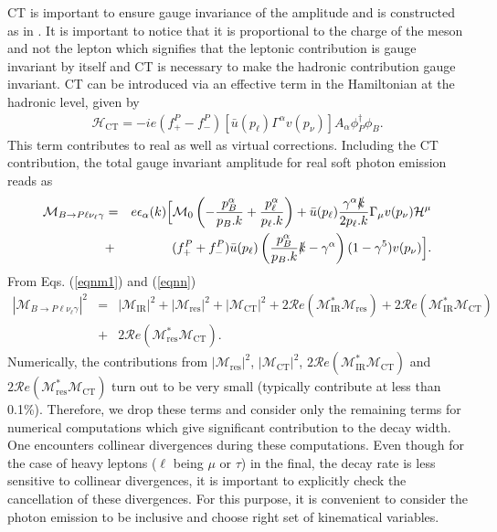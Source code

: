 \documentclass[a4paper,11pt]{article}
\begin{document}
	CT is important to ensure gauge invariance of the amplitude and is constructed as in \cite{Mishra:2020orb}. It is important to notice that it is proportional to the charge of the meson and not the lepton which signifies that the leptonic contribution is gauge invariant by itself and CT is necessary to make the hadronic contribution gauge invariant. CT can be introduced via an effective term in the Hamiltonian at the hadronic level, given by	
		\begin{eqnarray}
	\mathcal{H}_{\text{CT}}=-i e(f_+^P-f_-^P) \left[\bar{u}(p_{\ell})\Gamma^{\alpha} v(p_{\nu}) \right]A_{\alpha} \phi^{\dagger}_{P} \phi_{B}.
	\end{eqnarray} 
This term contributes to real as well as virtual corrections. Including the CT contribution, the total gauge invariant amplitude for real soft photon emission reads as
\begin{eqnarray}
	\mathcal{M}_{B\to P \ell \nu_{\ell} \gamma} &=& e \epsilon_{\alpha}(k) \Big[\mathcal{M}_{0} \left(-\frac{p_{B}^{\alpha}}{p_{B}.k}+\frac{p_{\ell}^{\alpha}}{p_{\ell}.k}\right)+\bar{u}(p_{\ell})\frac{\gamma^{\alpha}\slashed{k}}{2p_{\ell}.k}\Gamma_{\mu} v(p_{\nu}) \mathcal{H}^{\mu}\nonumber \\
	&+&  (f_{+}^P+f_{-}^P)\bar{u}(p_{\ell})\left(\frac{p_{B}^{\alpha}}{p_{B}.k}\slashed{k}-\gamma^{\alpha}\right) (1-\gamma^{5})v(p_{\nu}) \Big].
	\end{eqnarray}
	From Eqs. (\ref{eqnm1}) and (\ref{eqnn})
	\begin{eqnarray}
	\left|\mathcal{M}_{B\to P \ell \nu_{\ell} \gamma}\right|^{2} &=&\left|\mathcal{M}_{\text{IR}}\right|^{2}+\left|\mathcal{M}_{\text{res}}\right|^{2} +\left|\mathcal{M}_{\text{CT}}\right|^{2} + 2\mathcal{R}e(\mathcal{M}_{\text{IR}}^{*}\mathcal{M}_{\text{res}})+ 2\mathcal{R}e(\mathcal{M}_{\text{IR}}^{*}\mathcal{M}_{\text{CT}})\nonumber\\ &+& 2\mathcal{R}e(\mathcal{M}_{\text{res}}^{*}\mathcal{M}_{\text{CT}}).\label{2}
	\end{eqnarray}
	Numerically, the contributions from  $\left|\mathcal{M}_{\text{res}}\right|^{2}$, $\left|\mathcal{M}_{\text{CT}}\right|^{2}$, 
	$2\mathcal{R}e(\mathcal{M}_{\text{IR}}^{*}\mathcal{M}_{\text{CT}})$ and 
	$ 2\mathcal{R}e(\mathcal{M}_{\text{res}}^{*}\mathcal{M}_{\text{CT}})$ turn out to be very small 
	(typically contribute at less than 0.1\%). Therefore, we drop these terms and consider only the remaining terms for
	numerical computations which give significant contribution to the decay width. 
	One encounters collinear divergences during these computations. 
	Even though for the case of heavy leptons ($\ell$ being $\mu$ or $\tau$) in the final, the decay rate is less sensitive to 
	collinear divergences, it is important to explicitly check 
	the cancellation of these divergences. For this purpose, it is convenient to consider the photon emission to be inclusive and 
	choose right set of kinematical variables.
\end{document}
